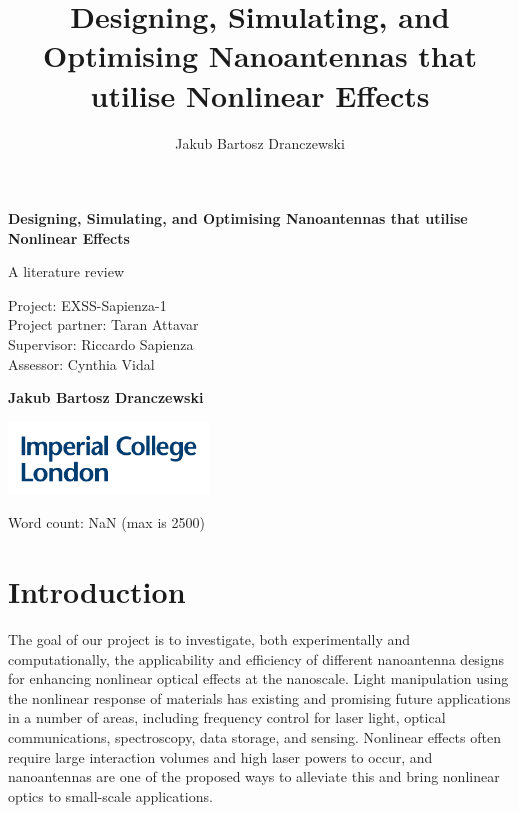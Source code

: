 \documentclass[12pt,a4paper]{article}
\author{Jakub Bartosz Dranczewski}
\title{Designing, Simulating, and Optimising Nanoantennas that utilise Nonlinear Effects}
\date{}
\begin{document}
\begin{titlepage}
	\begin{center}
		\vspace*{1cm}
		
		\Huge
		\textbf{Designing, Simulating, and Optimising Nanoantennas that utilise Nonlinear Effects}
		
		\Large
		A literature review
		
		\vspace{1.2cm}
		\large
		Project: EXSS-Sapienza-1\\
		Project partner: Taran Attavar\\
		Supervisor: Riccardo Sapienza\\
		Assessor: Cynthia Vidal
		
		\vspace{1.5cm}
		
		\textbf{Jakub Bartosz Dranczewski}
		
		\vfill
		
		\includegraphics[width=0.4\textwidth]{img/Imperial-logo.pdf}
		
		\vspace{0.4cm}
		
		
		Word count: NaN (max is 2500)
		
	\end{center}
\end{titlepage}

\begin{abstract}
\lipsum[9]

\end{abstract}

\section{Introduction}
The goal of our project is to investigate, both experimentally and computationally, the applicability and efficiency of different nanoantenna designs for enhancing nonlinear optical effects at the nanoscale. Light manipulation using the nonlinear response of materials has existing and promising future applications in a number of areas, including frequency control for laser light, optical communications, spectroscopy, data storage, and sensing\cite{garmireNonlinearOpticsDaily2013a}. Nonlinear effects often require large interaction volumes and high laser powers to occur, and nanoantennas are one of the proposed ways to alleviate this and bring nonlinear optics to small-scale applications.
\end{document}
